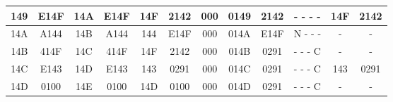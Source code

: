 \documentclass[12pt]{article}
\begin{document}
\begin{center}
{\begin{tabular}{|cc|cccccccc|cc|}
\multicolumn{1}{|c|}{149} & E14F & \multicolumn{1}{c|}{14A} & \multicolumn{1}{c|}{E14F} & \multicolumn{1}{c|}{14F} & \multicolumn{1}{c|}{2142} & \multicolumn{1}{c|}{000} & \multicolumn{1}{c|}{0149} & \multicolumn{1}{c|}{2142} & - - - - & \multicolumn{1}{c|}{14F} & 2142 \\ \hline
\multicolumn{1}{|c|}{14A} & A144 & \multicolumn{1}{c|}{14B} & \multicolumn{1}{c|}{A144} & \multicolumn{1}{c|}{144} & \multicolumn{1}{c|}{E14F} & \multicolumn{1}{c|}{000} & \multicolumn{1}{c|}{014A} & \multicolumn{1}{c|}{E14F} & N - - - & \multicolumn{1}{c|}{-} & - \\ \hline
\multicolumn{1}{|c|}{14B} & 414F & \multicolumn{1}{c|}{14C} & \multicolumn{1}{c|}{414F} & \multicolumn{1}{c|}{14F} & \multicolumn{1}{c|}{2142} & \multicolumn{1}{c|}{000} & \multicolumn{1}{c|}{014B} & \multicolumn{1}{c|}{0291} & - - - C & \multicolumn{1}{c|}{-} & - \\ \hline
\multicolumn{1}{|c|}{14C} & E143 & \multicolumn{1}{c|}{14D} & \multicolumn{1}{c|}{E143} & \multicolumn{1}{c|}{143} & \multicolumn{1}{c|}{0291} & \multicolumn{1}{c|}{000} & \multicolumn{1}{c|}{014C} & \multicolumn{1}{c|}{0291} & - - - C & \multicolumn{1}{c|}{143} & 0291 \\ \hline
\multicolumn{1}{|c|}{14D} & 0100 & \multicolumn{1}{c|}{14E} & \multicolumn{1}{c|}{0100} & \multicolumn{1}{c|}{14D} & \multicolumn{1}{c|}{0100} & \multicolumn{1}{c|}{000} & \multicolumn{1}{c|}{014D} & \multicolumn{1}{c|}{0291} & - - - C & \multicolumn{1}{c|}{-} & - \\ \hline
\end{tabular}}
\end{center}
\end{document}
